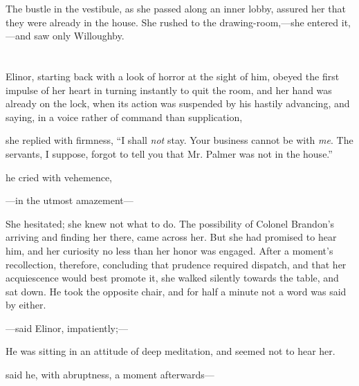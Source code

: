 The bustle in the vestibule, as she passed along an inner lobby, assured her that they were already in the house. She rushed to the drawing-room,---she entered it,---and saw only Willoughby.

\chapter{} %

Elinor, starting back with a look of horror at the sight of him, obeyed the first impulse of her heart in turning instantly to quit the room, and her hand was already on the lock, when its action was suspended by his hastily advancing, and saying, in a voice rather of command than supplication,


 she replied with firmness, “I shall {\em not} stay. Your business cannot be with {\em me}. The servants, I suppose, forgot to tell you that Mr. Palmer was not in the house.”

 he cried with vehemence, 

---in the utmost amazement---


She hesitated; she knew not what to do. The possibility of Colonel Brandon's arriving and finding her there, came across her. But she had promised to hear him, and her curiosity no less than her honor was engaged. After a moment's recollection, therefore, concluding that prudence required dispatch, and that her acquiescence would best promote it, she walked silently towards the table, and sat down. He took the opposite chair, and for half a minute not a word was said by either.

---said Elinor, impatiently;---

He was sitting in an attitude of deep meditation, and seemed not to hear her.

 said he, with abruptness, a moment afterwards---

